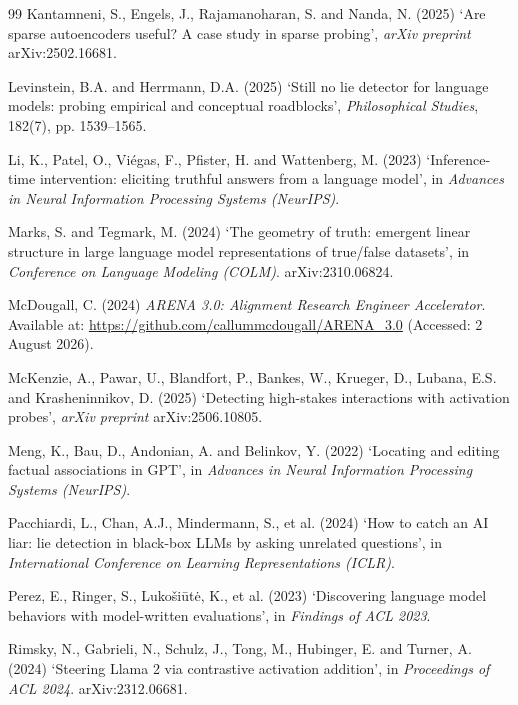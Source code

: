 \documentclass[conference]{IEEEtran}
\begin{document}
\begin{thebibliography}{99}
Kantamneni, S., Engels, J., Rajamanoharan, S. and Nanda, N. (2025) `Are sparse
autoencoders useful? A case study in sparse probing', \textit{arXiv preprint}
arXiv:2502.16681.

Levinstein, B.A. and Herrmann, D.A. (2025) `Still no lie detector for language
models: probing empirical and conceptual roadblocks',
\textit{Philosophical Studies}, 182(7), pp. 1539--1565.

Li, K., Patel, O., Vi\'egas, F., Pfister, H. and Wattenberg, M. (2023)
`Inference-time intervention: eliciting truthful answers from a language model',
in \textit{Advances in Neural Information Processing Systems (NeurIPS)}.

Marks, S. and Tegmark, M. (2024) `The geometry of truth: emergent linear
structure in large language model representations of true/false datasets', in
\textit{Conference on Language Modeling (COLM)}. arXiv:2310.06824.

McDougall, C. (2024) \textit{ARENA 3.0: Alignment Research Engineer
Accelerator}. Available at: \url{https://github.com/callummcdougall/ARENA_3.0}
(Accessed: 2 August 2026).

McKenzie, A., Pawar, U., Blandfort, P., Bankes, W., Krueger, D., Lubana, E.S.
and Krasheninnikov, D. (2025) `Detecting high-stakes interactions with
activation probes', \textit{arXiv preprint} arXiv:2506.10805.

Meng, K., Bau, D., Andonian, A. and Belinkov, Y. (2022) `Locating and editing
factual associations in GPT', in \textit{Advances in Neural Information
Processing Systems (NeurIPS)}.

Pacchiardi, L., Chan, A.J., Mindermann, S., et al. (2024) `How to catch an AI
liar: lie detection in black-box LLMs by asking unrelated questions', in
\textit{International Conference on Learning Representations (ICLR)}.

Perez, E., Ringer, S., Luko\v{s}i\=ut\.e, K., et al. (2023) `Discovering language
model behaviors with model-written evaluations', in \textit{Findings of ACL 2023}.

Rimsky, N., Gabrieli, N., Schulz, J., Tong, M., Hubinger, E. and Turner, A.
(2024) `Steering Llama 2 via contrastive activation addition', in
\textit{Proceedings of ACL 2024}. arXiv:2312.06681.


\end{thebibliography}
\end{document}

